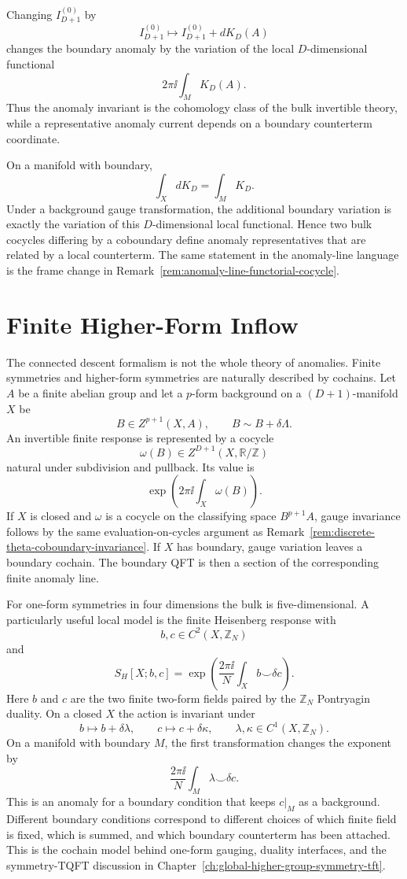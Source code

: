 \begin{remark}
\label{rem:inflow-cocycle-counterterm}
Changing \(I_{D+1}^{(0)}\) by
\[
  I_{D+1}^{(0)}\longmapsto I_{D+1}^{(0)}+dK_D(A)
\]
changes the boundary anomaly by the variation of the local
\(D\)-dimensional functional
\[
  2\pi\ii\int_M K_D(A).
\]
Thus the anomaly invariant is the cohomology class of the bulk invertible
theory, while a representative anomaly current depends on a boundary
counterterm coordinate.

On a manifold with boundary,
\[
  \int_X dK_D=\int_M K_D .
\]
Under a background gauge transformation, the additional boundary variation is
exactly the variation of this \(D\)-dimensional local functional.  Hence two
bulk cocycles differing by a coboundary define anomaly representatives that
are related by a local counterterm.  The same statement in the anomaly-line
language is the frame change in
Remark~\ref{rem:anomaly-line-functorial-cocycle}.
\end{remark}

\section{Finite Higher-Form Inflow}

The connected descent formalism is not the whole theory of anomalies.  Finite
symmetries and higher-form symmetries are naturally described by cochains.
Let \(A\) be a finite abelian group and let a \(p\)-form background on a
\((D+1)\)-manifold \(X\) be
\[
  B\in Z^{p+1}(X,A),
  \qquad
  B\sim B+\delta\Lambda .
\]
An invertible finite response is represented by a cocycle
\[
  \omega(B)\in Z^{D+1}(X,\mathbb R/\mathbb Z)
\]
natural under subdivision and pullback.  Its value is
\[
  \exp\left(2\pi\ii\int_X\omega(B)\right).
\]
If \(X\) is closed and \(\omega\) is a cocycle on the classifying space
\(B^{p+1}A\), gauge invariance follows by the same evaluation-on-cycles
argument as Remark~\ref{rem:discrete-theta-coboundary-invariance}.  If
\(X\) has boundary, gauge variation leaves a boundary cochain.  The boundary
QFT is then a section of the corresponding finite anomaly line.

For one-form symmetries in four dimensions the bulk is five-dimensional.  A
particularly useful local model is the finite Heisenberg response with
\[
  b,c\in C^2(X,\mathbb Z_N)
\]
and
\[
  S_H[X;b,c]
  =
  \exp\left(
    \frac{2\pi\ii}{N}\int_X b\smile\delta c
  \right).
\]
Here \(b\) and \(c\) are the two finite two-form fields paired by the
\(\mathbb Z_N\) Pontryagin duality.  On a closed \(X\) the action is invariant
under
\[
  b\mapsto b+\delta\lambda,\qquad c\mapsto c+\delta\kappa,
  \qquad
  \lambda,\kappa\in C^1(X,\mathbb Z_N).
\]
On a manifold with boundary \(M\), the first transformation changes the
exponent by
\[
  \frac{2\pi\ii}{N}\int_M \lambda\smile\delta c.
\]
This is an anomaly for a boundary condition that keeps \(c|_M\) as a
background.  Different boundary conditions correspond to different choices of
which finite field is fixed, which is summed, and which boundary counterterm
has been attached.  This is the cochain model behind one-form gauging,
duality interfaces, and the symmetry-TQFT discussion in
Chapter~\ref{ch:global-higher-group-symmetry-tft}.

